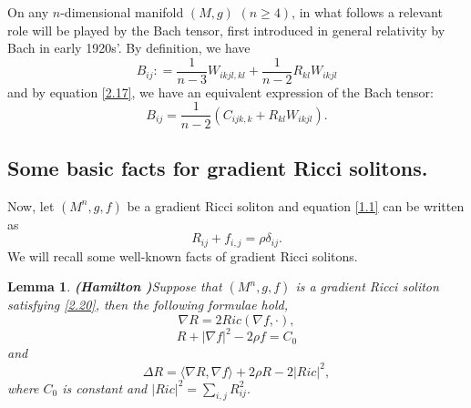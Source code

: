 \documentclass{amsart}
\newtheorem{lemma}[theorem]{Lemma}
\theoremstyle{definition}
\theoremstyle{remark}
\numberwithin{equation}{section}
\begin{document}
On any $n$-dimensional manifold $(M, g)$ $(n\geq 4)$,
in what follows a relevant role will be played by the Bach tensor, 
first introduced in general relativity by Bach \cite{bac} in early 1920s'.
 By definition, we have
\begin{equation}\label{2.18}
B_{ij}: = \frac{1}{n-3}W_{ikjl, kl} + \frac{1}{n-2}R_{kl}W_{ikjl}
\end{equation}
and by equation \eqref{2.17}, we have an equivalent expression of the Bach tensor:
\begin{equation}\label{2.19}
B_{ij} =\frac{1}{n-2} \left( C_{ijk, k}+R_{kl}W_{ikjl}\right).
\end{equation}

\subsection{Some basic facts for gradient Ricci solitons.}	
Now, let $(M^{n},g,f)$ be a gradient Ricci soliton and
equation \eqref{1.1} can be written as
\begin{equation}\label{2.20}
R_{ij}+f_{i,j}=\rho \delta_{ij}.
\end{equation}
We will recall some well-known facts of gradient Ricci solitons.

\begin{lemma} {\bf (Hamilton \cite{Ha95F})}\label{lemma2.1}
	Suppose that $(M^{n}, g, f)$ is a gradient Ricci soliton
	satisfying \eqref{2.20}, then the following formulae hold,
	\begin{equation}\label{2.21}
	\nabla R =2Ric(\nabla f, \cdot),
	\end{equation}
	\begin{equation}\label{2.22}
	R + \left| \nabla f \right|^ 2 - 2\rho f = C_0
	\end{equation}
	and
	\begin{equation}\label{2.23}
	\Delta R=\langle \nabla R, \nabla f \rangle + 2\rho R - 2|Ric|^{2},
	\end{equation}
	where $C_0$ is constant and $|Ric|^{2}=\sum\limits_{i,j}R_{ij}^{2}.$
	\end {lemma}
	
\end{document}
